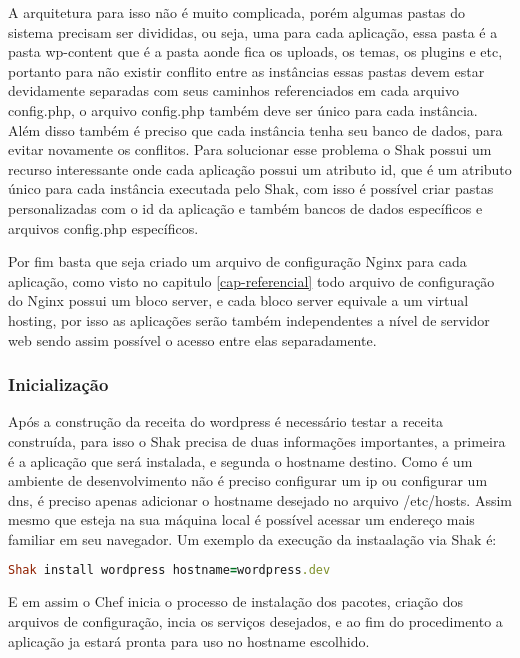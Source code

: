 A arquitetura para isso não é muito complicada, porém algumas pastas do sistema
precisam ser divididas, ou seja, uma para cada aplicação, essa pasta é a pasta wp-content
que é a pasta aonde fica os uploads, os temas, os plugins e etc, portanto para não
existir conflito entre as instâncias essas pastas devem estar devidamente separadas
com seus caminhos referenciados em cada arquivo config.php, o arquivo config.php também
deve ser único para cada instância. Além disso também é preciso que cada instância
tenha seu banco de dados, para evitar novamente os conflitos. Para
solucionar esse problema o Shak possui um recurso interessante onde cada aplicação
possui um atributo id, que é um atributo único para cada instância executada pelo
Shak, com isso é possível criar pastas personalizadas com o id da aplicação e também
bancos de dados específicos e arquivos config.php específicos.

Por fim basta que seja criado um arquivo de configuração Nginx para cada aplicação,
como visto no capitulo \ref{cap-referencial} todo arquivo de configuração
do Nginx possui um bloco server, e cada bloco server equivale a um virtual hosting,
por isso as aplicações serão também independentes a nível de servidor web sendo assim
possível o acesso entre elas separadamente.

\subsubsection{Inicialização}

Após a construção da receita do wordpress é necessário testar a receita construída,
para isso o Shak precisa de duas informações importantes, a primeira é a aplicação
que será instalada, e segunda o hostname destino. Como é um ambiente de desenvolvimento
não é preciso configurar um ip ou configurar um dns, é preciso apenas adicionar o
hostname desejado no arquivo /etc/hosts. Assim mesmo que esteja na sua máquina local
é possível acessar um endereço mais familiar em seu navegador. Um exemplo da execução
da instaalação via Shak é:

\begin{lstlisting}[language=Ruby,label=dice_index,caption={Exemplo de exexução de instalação do wordpress com shak}]
Shak install wordpress hostname=wordpress.dev
\end{lstlisting}

E em assim o Chef inicia o processo de instalação dos pacotes, criação dos arquivos
de configuração, incia os serviços desejados, e ao fim do procedimento a aplicação
ja estará pronta para uso no hostname escolhido.

